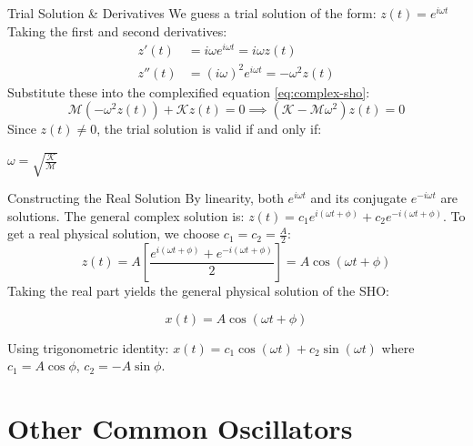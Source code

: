 \documentclass[aspectratio=169,xcolor=dvipsnames]{beamer}
\begin{document}
\begin{frame}{Trial Solution \& Derivatives}
  We guess a trial solution of the form: \quad $z(t) = e^{i\omega t}$
  \vspace{0.8em}
  \pause
  Taking the first and second derivatives:
  \begin{align*}
    z'(t)  & = i\omega e^{i\omega t} = i\omega z(t) \\
    z''(t) & = (i\omega)^2 e^{i\omega t} = -\omega^2 z(t)
  \end{align*}
  \pause
  Substitute these into the complexified equation \eqref{eq:complex-sho}:
  \[
    \mathcal{M}(-\omega^2 z(t)) + \mathcal{K}z(t) = 0 \implies (\mathcal{K} - \mathcal{M}\omega^2)z(t) = 0
  \]
  Since $z(t) \neq 0$, the trial solution is valid if and only if:
  \begin{umformula}
    \centering
    $\omega = \sqrt{\frac{\mathcal{K}}{\mathcal{M}}}$
  \end{umformula}
\end{frame}

\begin{frame}{Constructing the Real Solution}
  By linearity, both $e^{i\omega t}$ and its conjugate $e^{-i\omega t}$ are solutions. The general complex solution is:
  $z(t) = c_1 e^{i(\omega t + \phi)} + c_2 e^{-i(\omega t + \phi)}$.
  \pause
  \vspace{0.4em}
  To get a real physical solution, we choose $c_1 = c_2 = \frac{A}{2}$:
  \[
    z(t) = A \left[ \frac{e^{i(\omega t + \phi)} + e^{-i(\omega t + \phi)}}{2} \right] = A\cos(\omega t + \phi)
  \]
  \pause
  Taking the real part yields the general physical solution of the SHO:
  \begin{umformula}
    \begin{equation}
      \boxed{x(t) = A\cos(\omega t + \phi)}
    \end{equation}
  \end{umformula}
  Using trigonometric identity: $x(t) = c_1 \cos(\omega t) + c_2 \sin(\omega t)$ where $c_1 = A\cos\phi$, $c_2 = -A\sin\phi$.
\end{frame}

\section{Other Common Oscillators}
\end{document}
